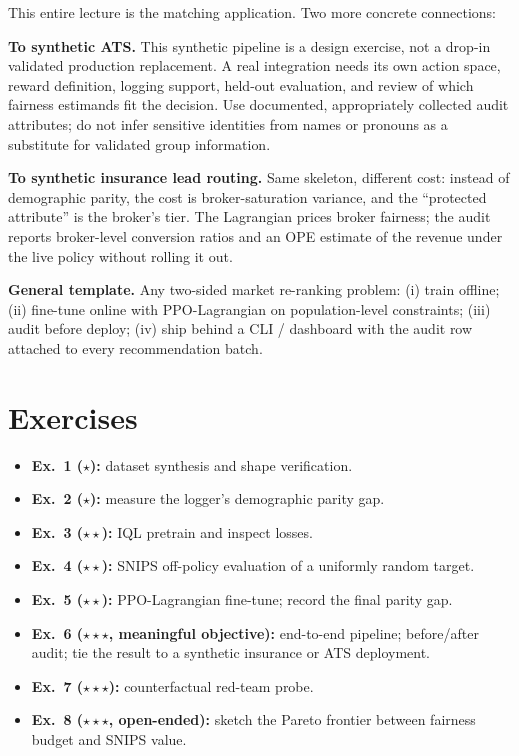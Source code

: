 \documentclass[11pt,oneside]{scrbook}
\begin{document}
\begin{matching}
This entire lecture is the matching application. Two more concrete connections:

\textbf{To synthetic ATS.} This synthetic pipeline is a design exercise, not a
drop-in validated production replacement. A real integration needs its own
action space, reward definition, logging support, held-out evaluation, and
review of which fairness estimands fit the decision. Use documented,
appropriately collected audit attributes; do not infer sensitive identities
from names or pronouns as a substitute for validated group information.

\textbf{To synthetic insurance lead routing.} Same skeleton, different cost: instead of
demographic parity, the cost is broker-saturation variance, and the
``protected attribute'' is the broker's tier. The Lagrangian prices broker
fairness; the audit reports broker-level conversion ratios and an OPE
estimate of the revenue under the live policy without rolling it out.

\textbf{General template.} Any two-sided market re-ranking problem:
(i) train offline; (ii) fine-tune online with PPO-Lagrangian on
population-level constraints; (iii) audit before deploy; (iv) ship behind
a CLI / dashboard with the audit row attached to every recommendation
batch.
\end{matching}

\chapter{Exercises}
\begin{itemize}[leftmargin=*]
  \item \textbf{Ex.\ 1 ($\star$):} dataset synthesis and shape verification.
  \item \textbf{Ex.\ 2 ($\star$):} measure the logger's demographic parity gap.
  \item \textbf{Ex.\ 3 ($\star\star$):} IQL pretrain and inspect losses.
  \item \textbf{Ex.\ 4 ($\star\star$):} SNIPS off-policy evaluation of a
        uniformly random target.
  \item \textbf{Ex.\ 5 ($\star\star$):} PPO-Lagrangian fine-tune; record the
        final parity gap.
  \item \textbf{Ex.\ 6 ($\star\star\star$, meaningful objective):} end-to-end
        pipeline; before/after audit; tie the result to a synthetic insurance or ATS
        deployment.
  \item \textbf{Ex.\ 7 ($\star\star\star$):} counterfactual red-team probe.
  \item \textbf{Ex.\ 8 ($\star\star\star$, open-ended):} sketch the Pareto
        frontier between fairness budget and SNIPS value.
\end{itemize}
\end{document}
